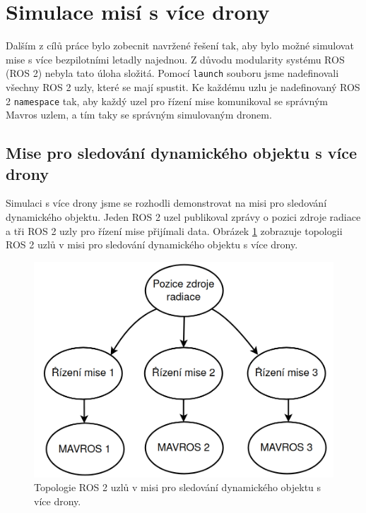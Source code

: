\section{Simulace misí s více drony}

Dalším z cílů práce bylo zobecnit navržené řešení tak, aby bylo možné simulovat mise s více bezpilotními letadly najednou. Z důvodu modularity systému ROS (ROS 2) nebyla tato úloha složitá. Pomocí \texttt{launch} souboru jsme nadefinovali všechny ROS 2 uzly, které se mají spustit. Ke každému uzlu je nadefinovaný ROS 2 \texttt{namespace} tak, aby každý uzel pro řízení mise komunikoval se správným Mavros uzlem, a tím taky se správným simulovaným dronem.

\subsection{Mise pro sledování dynamického objektu s více drony}

Simulaci s více drony jsme se rozhodli demonstrovat na misi pro sledování dynamického objektu. Jeden ROS 2 uzel publikoval zprávy o pozici zdroje radiace a tři ROS 2 uzly pro řízení mise přijímali data. Obrázek \ref{fig:SIM3MULNODE} zobrazuje topologii ROS 2 uzlů v misi pro sledování dynamického objektu s více drony.

\begin{figure}[!ht]
  \begin{center}
    \includegraphics[scale=0.32]{obrazky/MULNODE}
  \end{center}
  \caption[Topologie ROS 2 uzlů v misi pro sledování dynamického objektu s více drony]{Topologie ROS 2 uzlů v misi pro sledování dynamického objektu s více drony.}
  \label{fig:SIM3MULNODE}
\end{figure}

